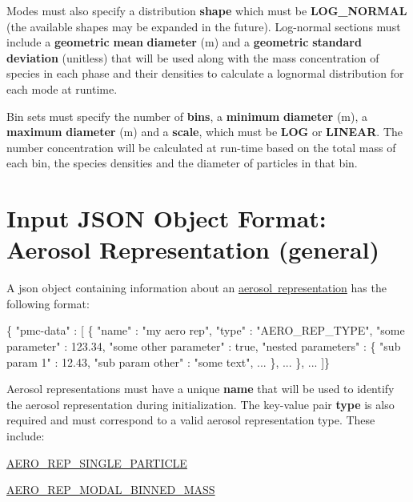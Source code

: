 Modes must also specify a distribution {\bfseries shape} which must be {\bfseries L\+O\+G\+\_\+\+N\+O\+R\+M\+AL} (the available shapes may be expanded in the future). Log-\/normal sections must include a {\bfseries geometric} {\bfseries mean} {\bfseries diameter} (m) and a {\bfseries geometric} {\bfseries standard} {\bfseries deviation} (unitless) that will be used along with the mass concentration of species in each phase and their densities to calculate a lognormal distribution for each mode at runtime.

Bin sets must specify the number of {\bfseries bins}, a {\bfseries minimum} {\bfseries diameter} (m), a {\bfseries maximum} {\bfseries diameter} (m) and a {\bfseries scale}, which must be {\bfseries L\+OG} or {\bfseries L\+I\+N\+E\+AR}. The number concentration will be calculated at run-\/time based on the total mass of each bin, the species densities and the diameter of particles in that bin. \hypertarget{input_format_aero_rep}{}\section{Input J\+S\+ON Object Format\+: Aerosol Representation (general)}\label{input_format_aero_rep}
A {\ttfamily json} object containing information about an \mbox{\hyperlink{phlex_aero_rep}{aerosol representation}} has the following format\+:


\begin{DoxyCode}
\{ "pmc-data" : [
  \{
    "name" : "my aero rep",
    "type" : "AERO\_REP\_TYPE",
    "some parameter" : 123.34,
    "some other parameter" : true,
    "nested parameters" : \{
      "sub param 1" : 12.43,
      "sub param other" : "some text",
      ...
    \},
    ...
  \},
  ...
]\}
\end{DoxyCode}
 Aerosol representations must have a unique {\bfseries name} that will be used to identify the aerosol representation during initialization. The key-\/value pair {\bfseries type} is also required and must correspond to a valid aerosol representation type. These include\+:


\begin{DoxyItemize}
\item \mbox{\hyperlink{phlex_aero_rep_single_particle}{A\+E\+R\+O\+\_\+\+R\+E\+P\+\_\+\+S\+I\+N\+G\+L\+E\+\_\+\+P\+A\+R\+T\+I\+C\+LE}}
\item \mbox{\hyperlink{phlex_aero_rep_modal_binned_mass}{A\+E\+R\+O\+\_\+\+R\+E\+P\+\_\+\+M\+O\+D\+A\+L\+\_\+\+B\+I\+N\+N\+E\+D\+\_\+\+M\+A\+SS}}
\end{DoxyItemize}

